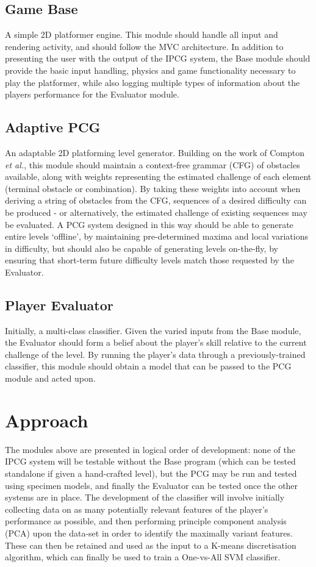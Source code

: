 \documentclass[a4paper,oneside,12pt,openany]{memoir}
\begin{document}
\subsection{Game Base}
A simple 2D platformer engine. This module should handle all input and rendering activity, and should follow the MVC architecture. In addition to presenting the user with the output of the IPCG system, the Base module should provide the basic input handling, physics and game functionality necessary to play the platformer, while also logging multiple types of information about the players performance for the Evaluator module. 
\subsection{Adaptive PCG}
An adaptable 2D platforming level generator. Building on the work of Compton \emph{et al.}\cite{compton2006procedural}, this module should maintain a context-free grammar (CFG) of obstacles available, along with weights representing the estimated challenge of each element (terminal obstacle or combination). By taking these weights into account when deriving a string of obstacles from the CFG, sequences of a desired difficulty can be produced - or alternatively, the estimated challenge of existing sequences may be evaluated. A PCG system designed in this way should be able to generate entire levels `offline', by maintaining pre-determined maxima and local variations in difficulty, but should also be capable of generating levels on-the-fly, by ensuring that short-term future difficulty levels match those requested by the Evaluator.
\newpage
\vspace*{1.4cm}
\subsection{Player Evaluator}
Initially, a multi-class classifier. Given the varied inputs from the Base module, the Evaluator should form a belief about the player's skill relative to the current challenge of the level. By running the player's data through a previously-trained classifier, this module should obtain a model that can be passed to the PCG module and acted upon.
 \section{Approach}
The modules above are presented in logical order of development: none of the IPCG system will be testable without the Base program (which can be tested standalone if given a hand-crafted level), but the PCG may be run and tested using specimen models, and finally the Evaluator can be tested once the other systems are in place.
 The development of the classifier will involve initially collecting data on as many potentially relevant features of the player's performance as possible, and then performing principle component analysis (PCA) upon the data-set in order to identify the maximally variant features. These can then be retained and used as the input to a K-means discretisation algorithm, which can finally be used to train a One-vs-All SVM classifier. 
\end{document}
